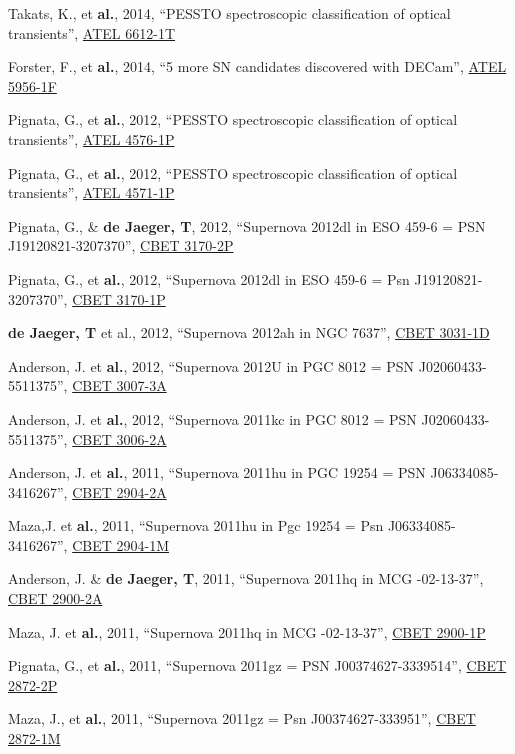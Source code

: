 \documentclass[12pt]{article}
\begin{document}
\begin{bibenum}
    \item Takats, K., et \textbf{al.}, 2014, ``PESSTO spectroscopic classification of optical transients'', \href{http://adsabs.harvard.edu/abs/2014ATel.6612....1T}{ATEL 6612-1T}
    \item Forster, F., et \textbf{al.}, 2014, ``5 more SN candidates discovered with DECam'', \href{http://adsabs.harvard.edu/abs/2014ATel.5956....1F}{ATEL 5956-1F}
    \item Pignata, G., et \textbf{al.}, 2012, ``PESSTO spectroscopic classification of optical transients'', \href{http://adsabs.harvard.edu/abs/2012ATel.4576....1P}{ATEL 4576-1P}
    \item Pignata, G., et \textbf{al.}, 2012, ``PESSTO spectroscopic classification of optical transients'', \href{http://adsabs.harvard.edu/abs/2012ATel.4571....1P}{ATEL 4571-1P}
    \item Pignata, G., \& \textbf{de Jaeger, T}, 2012, ``Supernova 2012dl in ESO 459-6 = PSN J19120821-3207370'', \href{http://adsabs.harvard.edu/abs/2012CBET.3170....2P}{CBET 3170-2P}
    \item Pignata, G., et \textbf{al.}, 2012, ``Supernova 2012dl in ESO 459-6 = Psn J19120821-3207370'', \href{http://adsabs.harvard.edu/abs/2012CBET.3170....1P}{CBET 3170-1P}
    \item \textbf{de Jaeger, T} et al., 2012, ``Supernova 2012ah in NGC 7637'', \href{http://adsabs.harvard.edu/abs/2012CBET.3031....1D}{CBET 3031-1D}
    \item Anderson, J. et \textbf{al.}, 2012, ``Supernova 2012U in PGC 8012 = PSN J02060433-5511375'', \href{http://adsabs.harvard.edu/abs/2012CBET.3007....3A}{CBET 3007-3A}
    \item Anderson, J. et \textbf{al.}, 2012, ``Supernova 2011kc in PGC 8012 = PSN J02060433-5511375'', \href{http://adsabs.harvard.edu/abs/2012CBET.3006....2A}{CBET 3006-2A}
    \item Anderson, J. et \textbf{al.}, 2011, ``Supernova 2011hu in PGC 19254 = PSN J06334085-3416267'', \href{http://adsabs.harvard.edu/abs/2011CBET.2904....2A}{CBET 2904-2A}
    \item Maza,J. et \textbf{al.}, 2011, ``Supernova 2011hu in Pgc 19254 = Psn J06334085-3416267'', \href{http://adsabs.harvard.edu/abs/2011CBET.2904....1M}{CBET 2904-1M}
    \item Anderson, J. \& \textbf{de Jaeger, T}, 2011, ``Supernova 2011hq in MCG -02-13-37'', \href{http://adsabs.harvard.edu/abs/2011CBET.2900....2A}{CBET 2900-2A}
    \item Maza, J.  et \textbf{al.}, 2011, ``Supernova 2011hq in MCG -02-13-37'', \href{https://ui.adsabs.harvard.edu/abs/2011CBET.2900....1P/abstract}{CBET 2900-1P}
    \item Pignata, G., et \textbf{al.}, 2011, ``Supernova 2011gz = PSN J00374627-3339514'', \href{http://adsabs.harvard.edu/abs/2011CBET.2872....2P}{CBET 2872-2P}
    \item Maza, J., et \textbf{al.}, 2011, ``Supernova 2011gz = Psn J00374627-333951'', \href{http://adsabs.harvard.edu/abs/2011CBET.2872....1M}{CBET 2872-1M\\} 

\end{bibenum}
\end{document}
